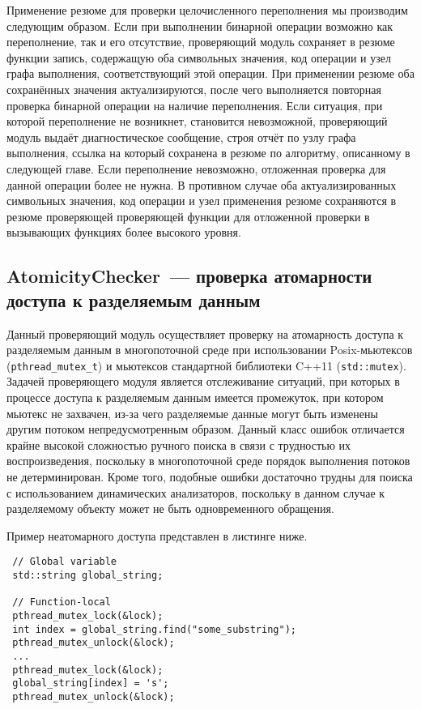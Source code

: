 Применение резюме для проверки целочисленного переполнения мы производим следующим образом. Если при выполнении бинарной операции возможно как переполнение, так и его отсутствие, проверяющий модуль сохраняет в резюме функции запись, содержащую оба символьных значения, код операции и узел графа выполнения, соответствующий этой операции. При применении резюме оба сохранённых значения актуализируются, после чего выполняется повторная проверка бинарной операции на наличие переполнения. Если ситуация, при которой переполнение не возникнет, становится невозможной, проверяющий модуль выдаёт диагностическое сообщение, строя отчёт по узлу графа выполнения, ссылка на который сохранена в резюме по алгоритму, описанному в следующей главе. Если переполнение невозможно, отложенная проверка для данной операции более не нужна. В противном случае оба актуализированных символьных значения, код операции и узел применения резюме сохраняются в резюме проверяющей проверяющей функции для отложенной проверки в вызывающих функциях более высокого уровня.

\subsection{AtomicityChecker~--- проверка атомарности доступа к разделяемым данным}

Данный проверяющий модуль осуществляет проверку на атомарность доступа к разделяемым данным в многопоточной среде при использовании Posix-мьютексов (\texttt{pthread\_mutex\_t}) и мьютексов стандартной библиотеки C++11 (\texttt{std::mutex}). Задачей проверяющего модуля является отслеживание ситуаций, при которых в процессе доступа к разделяемым данным имеется промежуток, при котором мьютекс не захвачен, из-за чего разделяемые данные могут быть изменены другим потоком непредусмотренным образом. Данный класс ошибок отличается крайне высокой сложностью ручного поиска в связи с трудностью их воспроизведения, поскольку в многопоточной среде порядок выполнения потоков не детерминирован. Кроме того, подобные ошибки достаточно трудны для поиска с использованием динамических анализаторов, поскольку в данном случае к разделяемому объекту может не быть одновременного обращения.

Пример неатомарного доступа представлен в листинге ниже.

\begin{verbatim}
 // Global variable
 std::string global_string;
 
 // Function-local
 pthread_mutex_lock(&lock);
 int index = global_string.find("some_substring");
 pthread_mutex_unlock(&lock);
 ...
 pthread_mutex_lock(&lock);
 global_string[index] = 's';
 pthread_mutex_unlock(&lock);
\end{verbatim}

